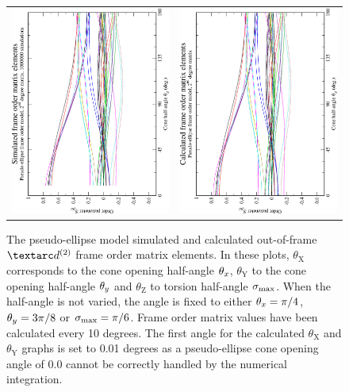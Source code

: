 \begin{figure}
\begin{tabular}{@{}cc@{}}
    \\[-5pt]
    \includegraphics[width=.35\textwidth,angle=270]{images/frame_order_matrix/Sijkl_pseudo-ellipse_out_of_frame_theta_z_ens1000000.eps} &
    \includegraphics[width=.35\textwidth,angle=270]{images/frame_order_matrix/Sijkl_pseudo-ellipse_out_of_frame_theta_z_calc.eps} \\
  \end{tabular}
  \caption[Pseudo-ellipse simulated and calculated out-of-frame Daeg$^{(2)}$ elements.]{
    The pseudo-ellipse model simulated and calculated out-of-frame $\FOtwo$ frame order matrix elements.
    In these plots, $\theta_\textrm{X}$ corresponds to the cone opening half-angle $\theta_x$, $\theta_\textrm{Y}$ to the cone opening half-angle $\theta_y$ and $\theta_\textrm{Z}$ to torsion half-angle $\sigma_\textrm{max}$.
    When the half-angle is not varied, the angle is fixed to either $\theta_x = \pi/4$, $\theta_y = 3\pi/8$ or $\sigma_\textrm{max} = \pi/6$.
    Frame order matrix values have been calculated every 10 degrees.
    The first angle for the calculated $\theta_\textrm{X}$ and $\theta_\textrm{Y}$ graphs is set to 0.01 degrees as a pseudo-ellipse cone opening angle of 0.0 cannot be correctly handled by the numerical integration.
  }
  \label{fig: simulated and calculated out-of-frame 2nd degree pseudo-ellipse frame order}
\end{figure}



